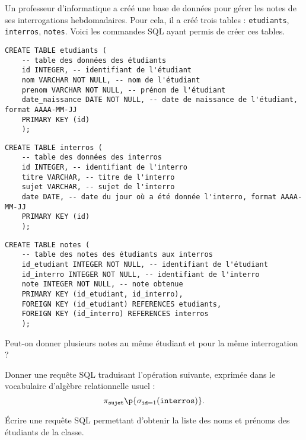 Un professeur d'informatique a créé une base de données pour gérer les notes de ses interrogations hebdomadaires. 
Pour cela, il a créé trois tables : \texttt{etudiants}, \texttt{interros}, \texttt{notes}. 
Voici les commandes SQL ayant permis de créer ces tables. 

\begin{verbatim}
CREATE TABLE etudiants (
    -- table des données des étudiants
    id INTEGER, -- identifiant de l'étudiant
    nom VARCHAR NOT NULL, -- nom de l'étudiant
    prenom VARCHAR NOT NULL, -- prénom de l'étudiant
    date_naissance DATE NOT NULL, -- date de naissance de l'étudiant, format AAAA-MM-JJ
    PRIMARY KEY (id)
    );
\end{verbatim}

\begin{verbatim}
CREATE TABLE interros (
    -- table des données des interros
    id INTEGER, -- identifiant de l'interro
    titre VARCHAR, -- titre de l'interro
    sujet VARCHAR, -- sujet de l'interro
    date DATE, -- date du jour où a été donnée l'interro, format AAAA-MM-JJ
    PRIMARY KEY (id)
    );
\end{verbatim}

\begin{verbatim}
CREATE TABLE notes (
    -- table des notes des étudiants aux interros
    id_etudiant INTEGER NOT NULL, -- identifiant de l'étudiant
    id_interro INTEGER NOT NULL, -- identifiant de l'interro
    note INTEGER NOT NULL, -- note obtenue
    PRIMARY KEY (id_etudiant, id_interro),
    FOREIGN KEY (id_etudiant) REFERENCES etudiants,
    FOREIGN KEY (id_interro) REFERENCES interros
    );
\end{verbatim}

\medskip{}

\question{} Peut-on donner plusieurs notes au même étudiant et pour la même interrogation ? 

\medskip{}

\question{} Donner une requête SQL traduisant l'opération suivante, exprimée dans le vocabulaire d'algèbre relationnelle usuel : 
\begin{equation*}
  \pi_{\texttt{sujet}}\p{\sigma_{\texttt{id}=1}(\texttt{interros})}.
\end{equation*}

\medskip{}

\question{} Écrire une requête SQL permettant d'obtenir la liste des noms et prénoms des étudiants de la classe. 

\medskip{}

